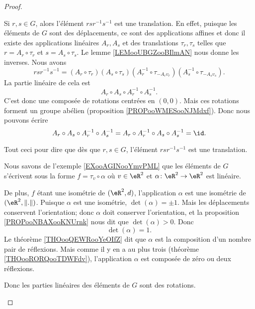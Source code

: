 \begin{proof}
\begin{subproof}
		\spitem[Translation]
		Si \( r,s\in G\), alors l'élément \( rsr^{-1}s^{-1}\) est une translation. En effet, puisque les éléments de \( G\) sont des déplacements, ce sont des applications affines et donc il existe des applications linéaires \( A_r,A_s\) et des translations \( \tau_r,\tau_s\) telles que \( r=A_r\circ \tau_r\) et \( s=A_s\circ \tau_s\). Le lemme \ref{LEMooUBGZooBIlmAN} nous donne les inverses. Nous avons
		\begin{equation}
			rsr^{-1}s^{-1}=(A_r\circ \tau_r)(A_s\circ \tau_s)(A_r^{-1}\circ \tau_{-A_rv_r})(A_s^{-1}\circ \tau_{-A_sv_s}).
		\end{equation}
		La partie linéaire de cela est
		\begin{equation}
			A_r\circ A_s\circ A_r^{-1}\circ A_s^{-1}.
		\end{equation}
		C'est donc une composée de rotations centrées en \( (0,0)\). Mais ces rotations forment un groupe abélien (proposition \ref{PROPooWMESooNJMdxf}). Donc nous pouvons écrire
		\begin{equation}
			A_r\circ A_s\circ A_r^{-1}\circ A_s^{-1}=A_r\circ A_r^{-1}\circ A_s\circ A_s^{-1}=\id.
		\end{equation}

		Tout ceci pour dire que dès que \( r,s\in G\), l'élément \( rsr^{-1} s^{-1}\) est une translation.

		Nous savons de l'exemple \ref{EXooAGINooYmvPML} que les éléments de \( G\) s'écrivent sous la forme \( f=\tau_v\circ \alpha\) où \( v\in \eR^2\) et \( \alpha\colon \eR^2\to \eR^2\) est linéaire.

		De plus, \( f\) étant une isométrie de \( (\eR^2,d)\), l'application \( \alpha\) est une isométrie de \( (\eR^2,\| . \|)\). Puisque \( \alpha\) est une isométrie, \( \det(\alpha)=\pm1\). Mais les déplacements conservent l'orientation; donc \( \alpha\) doit conserver l'orientation, et la proposition \ref{PROPooNBAXooKNUrnk} nous dit que \( \det(\alpha)>0\). Donc
		\begin{equation}
			\det(\alpha)=1.
		\end{equation}
		Le théorème \ref{THOooQEWRooYeOIfZ} dit que \( \alpha\) est la composition d'un nombre pair de réflexions. Mais comme il y en a au plus trois (théorème \ref{THOooRORQooTDWFdv}), l'application \( \alpha\) est composée de zéro ou deux réflexions.

		Donc les parties linéaires des éléments de \( G\) sont des rotations.


\end{subproof}
\end{proof}
